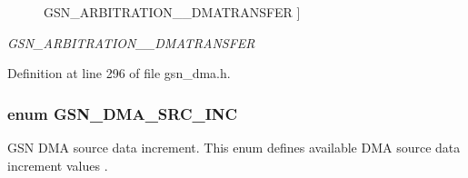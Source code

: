 \begin{Desc}
\begin{description}
{{GSN\_\-ARBITRATION\_\_\-DMATRANSFER}
\label{a00645_gga0dab047350d5c343038b0c017077dab7ae40c66cc1004676d5c628cf479f658c8}
}]\item[{\em 
\hypertarget{a00645_gga0dab047350d5c343038b0c017077dab7a9a6dd4b1c4e3039f312c7e123adee60b}{
GSN\_\-ARBITRATION\_\-1024\_\-DMATRANSFER}
\label{a00645_gga0dab047350d5c343038b0c017077dab7a9a6dd4b1c4e3039f312c7e123adee60b}
}]\end{description}
\end{Desc}



Definition at line 296 of file gsn\_\-dma.h.

\hypertarget{a00645_ga592093c11bfd36ebbe08e1446e26f37a}{
\subsubsection[{GSN\_\-DMA\_\-SRC\_\-INC}]{\setlength{\rightskip}{0pt plus 5cm}enum {\bf GSN\_\-DMA\_\-SRC\_\-INC}}}
\label{a00645_ga592093c11bfd36ebbe08e1446e26f37a}


GSN DMA source data increment. This enum defines available DMA source data increment values . 

